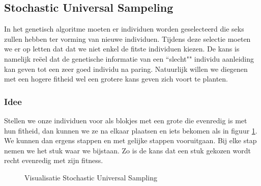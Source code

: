 %
\subsection{Stochastic Universal Sampeling}
\label{sub:SUS}
In het genetisch algoritme moeten er individuen worden geselecteerd die seks zullen hebben ter vorming van nieuwe individuen.
Tijdens deze selectie moeten we er op letten dat dat we niet enkel de fitste individuen kiezen. De kans is namelijk reëel dat de genetische informatie van een ``slecht"" individu aanleiding kan geven tot een zeer goed individu na paring. Natuurlijk willen we diegenen met een hogere fitheid wel een grotere kans geven zich voort te planten.

\subsubsection{Idee}
Stellen we onze individuen voor als blokjes met een grote die evenredig is met hun fitheid, dan kunnen we ze na elkaar plaatsen en iets bekomen als in figuur \ref{fig:SUS}. 
We kunnen dan ergens stappen en met gelijke stappen vooruitgaan. Bij elke stap nemen we het stuk waar we bijstaan. Zo is de kans dat een stuk gekozen wordt recht evenredig met zijn fitness.

\begin{center}
\begin{figure}[H]
\centering
{}
\caption{Visualisatie Stochastic Universal Sampling}
\label{fig:SUS}
\end{figure}
\end{center}


